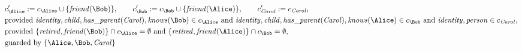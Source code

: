 \begin{align*}
&
c'_
{
\Alice
}
 := 
c_
{
\Alice
}
 \cup 
\{
\mathit{\detokenize{
friend
}}
(
\Bob
)
\}
, \qquad 
c'_
{
\Bob
}
 := 
c_
{
\Bob
}
 \cup 
\{
\mathit{\detokenize{
friend
}}
(
\Alice
)
\}
, \qquad 
c'_
{
\mathit{Carol}
}
 := 
c_
{
\mathit{Carol}
}
,\\
&
\text{provided } 
\mathit{\detokenize{
identity
}}
,
\mathit{\detokenize{
child
}}
,
\mathit{\detokenize{
has_parent
}}
(
\mathit{Carol}
)
,
\mathit{\detokenize{
knows
}}
(
\Bob
)
 \in c_
{
\Alice
}
 \text{ and } 
\mathit{\detokenize{
identity
}}
,
\mathit{\detokenize{
child
}}
,
\mathit{\detokenize{
has_parent
}}
(
\mathit{Carol}
)
,
\mathit{\detokenize{
knows
}}
(
\Alice
)
 \in c_
{
\Bob
}
 \text{ and } 
\mathit{\detokenize{
identity
}}
,
\mathit{\detokenize{
person
}}
 \in c_
{
\mathit{Carol}
}
,\\
&
\text{provided } 
\{
\mathit{\detokenize{
retired
}}
,
\mathit{\detokenize{
friend
}}
(
\Bob
)
\}
 \cap c_
{
\Alice
}
 = \emptyset
 \text{ and } 
\{
\mathit{\detokenize{
retired
}}
,
\mathit{\detokenize{
friend
}}
(
\Alice
)
\}
 \cap c_
{
\Bob
}
 = \emptyset
,\\
&
\text{guarded by } \{
\Alice
,
\Bob
,
\mathit{Carol}
\}
\end{align*}

